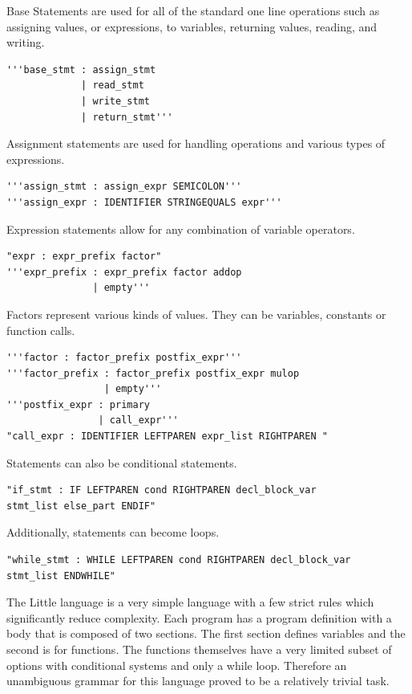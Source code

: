 \documentclass[12pt]{article}
\begin{document}
           Base Statements are used for all of the standard one line operations such as assigning values, or expressions, to variables, returning values, reading, and writing.
           \begin{verbatim}
'''base_stmt : assign_stmt
             | read_stmt
             | write_stmt
             | return_stmt'''
           \end{verbatim}
           
           Assignment statements are used for handling operations and various types of expressions.
           
           \begin{verbatim}
'''assign_stmt : assign_expr SEMICOLON'''
'''assign_expr : IDENTIFIER STRINGEQUALS expr'''
            \end{verbatim}		
           
			Expression statements allow for any combination of variable operators.  
			
			\begin{verbatim}
"expr : expr_prefix factor"      
'''expr_prefix : expr_prefix factor addop
               | empty'''
			\end{verbatim}	   
			
			Factors represent various kinds of values.  They can be variables, constants or function calls.
			
			\begin{verbatim}
'''factor : factor_prefix postfix_expr'''
'''factor_prefix : factor_prefix postfix_expr mulop
                 | empty'''
'''postfix_expr : primary
                | call_expr'''  
"call_expr : IDENTIFIER LEFTPAREN expr_list RIGHTPAREN "                                          
\end{verbatim}	
			
			Statements can also be conditional statements.
			\begin{verbatim}
"if_stmt : IF LEFTPAREN cond RIGHTPAREN decl_block_var
stmt_list else_part ENDIF"
            \end{verbatim}	
           
            Additionally, statements can become loops.
            \begin{verbatim}
"while_stmt : WHILE LEFTPAREN cond RIGHTPAREN decl_block_var
stmt_list ENDWHILE"
            \end{verbatim}
           
    		
    		The Little language is a very simple language with a few strict rules which significantly reduce complexity.  Each program has a program definition with a body that is composed of two sections.  The first section defines variables and the second is for functions.  The functions themselves have a very limited subset of options with conditional systems and only a while loop.  Therefore an unambiguous grammar for this language proved to be a relatively trivial task.  
    		
\end{document}
